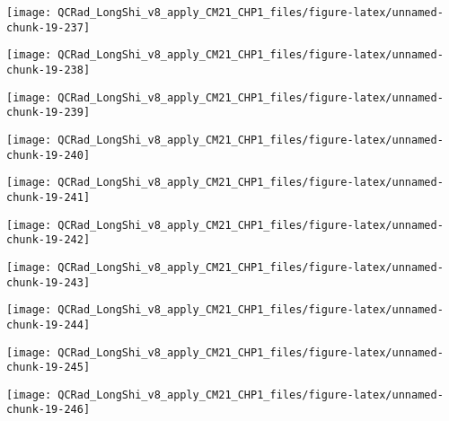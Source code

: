\documentclass[
  10pt,
  a4paper,oneside]{article}
\begin{document}
\begin{center}\texttt{[image: QCRad\_LongShi\_v8\_apply\_CM21\_CHP1\_files/figure-latex/unnamed-chunk-19-237]} \end{center}

\begin{center}\texttt{[image: QCRad\_LongShi\_v8\_apply\_CM21\_CHP1\_files/figure-latex/unnamed-chunk-19-238]} \end{center}

\begin{center}\texttt{[image: QCRad\_LongShi\_v8\_apply\_CM21\_CHP1\_files/figure-latex/unnamed-chunk-19-239]} \end{center}

\begin{center}\texttt{[image: QCRad\_LongShi\_v8\_apply\_CM21\_CHP1\_files/figure-latex/unnamed-chunk-19-240]} \end{center}

\begin{center}\texttt{[image: QCRad\_LongShi\_v8\_apply\_CM21\_CHP1\_files/figure-latex/unnamed-chunk-19-241]} \end{center}

\begin{center}\texttt{[image: QCRad\_LongShi\_v8\_apply\_CM21\_CHP1\_files/figure-latex/unnamed-chunk-19-242]} \end{center}

\begin{center}\texttt{[image: QCRad\_LongShi\_v8\_apply\_CM21\_CHP1\_files/figure-latex/unnamed-chunk-19-243]} \end{center}

\begin{center}\texttt{[image: QCRad\_LongShi\_v8\_apply\_CM21\_CHP1\_files/figure-latex/unnamed-chunk-19-244]} \end{center}

\begin{center}\texttt{[image: QCRad\_LongShi\_v8\_apply\_CM21\_CHP1\_files/figure-latex/unnamed-chunk-19-245]} \end{center}

\begin{center}\texttt{[image: QCRad\_LongShi\_v8\_apply\_CM21\_CHP1\_files/figure-latex/unnamed-chunk-19-246]} \end{center}
\end{document}
